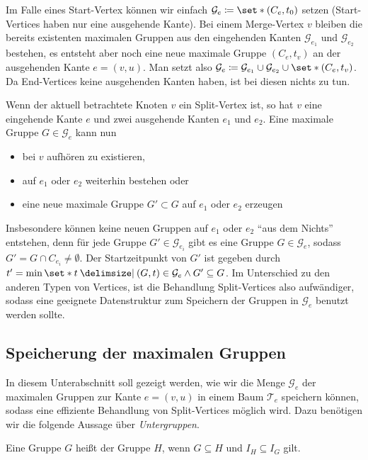 Im Falle eines Start-Vertex können wir einfach $\mathcal{G}_e \coloneqq \set*{(C_e,t_0)}$ setzen (Start-Vertices haben nur eine ausgehende Kante).
Bei einem Merge-Vertex $v$ bleiben die bereits existenten maximalen Gruppen aus den eingehenden Kanten $\mathcal{G}_{e_1}$ und $\mathcal{G}_{e_2}$ bestehen, es entsteht aber noch eine neue maximale Gruppe $(C_e,t_v)$ an der ausgehenden Kante $e=(v,u)$.
Man setzt also $\mathcal{G}_e \coloneqq \mathcal{G}_{e_1} \cup \mathcal{G}_{e_2} \cup \set*{(C_e,t_v)}$.
Da End-Vertices keine ausgehenden Kanten haben, ist bei diesen nichts zu tun.

Wenn der aktuell betrachtete Knoten $v$ ein Split-Vertex ist, so hat $v$ eine eingehende Kante $e$ und zwei ausgehende Kanten $e_1$ und $e_2$.
Eine maximale Gruppe $G \in \mathcal{G}_e$ kann nun
\begin{itemize}
	\item bei $v$ aufhören zu existieren,
	\item auf $e_1$ oder $e_2$ weiterhin bestehen oder
	\item eine neue maximale Gruppe $G' \subset G$ auf $e_1$ oder $e_2$ erzeugen
\end{itemize}
Insbesondere können keine neuen Gruppen auf $e_1$ oder $e_2$ \enquote{aus dem Nichts} entstehen, denn für jede Gruppe $G' \in \mathcal{G}_{e_i}$ gibt es eine Gruppe $G \in \mathcal{G}_e$, sodass $G' = G \cap C_{e_i} \neq \emptyset$.
Der Startzeitpunkt von $G'$ ist gegeben durch $t' = \min \set*{t \given (G,t) \in \mathcal{G}_e \wedge G' \subseteq G}$.
Im Unterschied zu den anderen Typen von Vertices, ist die Behandlung Split-Vertices also aufwändiger, sodass eine geeignete Datenstruktur zum Speichern der Gruppen in $\mathcal{G}_e$ benutzt werden sollte.

\subsection{Speicherung der maximalen Gruppen} %
\label{sub:speicherung_der_maximalen_gruppen}
In diesem Unterabschnitt soll gezeigt werden, wie wir die Menge $\mathcal{G}_e$ der maximalen Gruppen zur Kante $e=(v,u)$ in einem Baum $\mathcal{T}_e$ speichern können, sodass eine effiziente Behandlung von Split-Vertices möglich wird.
Dazu benötigen wir die folgende Aussage über \emph{Untergruppen}.

\begin{definition}[{name=[Untergruppe]}]
	Eine Gruppe $G$ heißt  der Gruppe $H$, wenn $G \subseteq H$ und $I_H \subseteq I_G$ gilt.
\end{definition}


